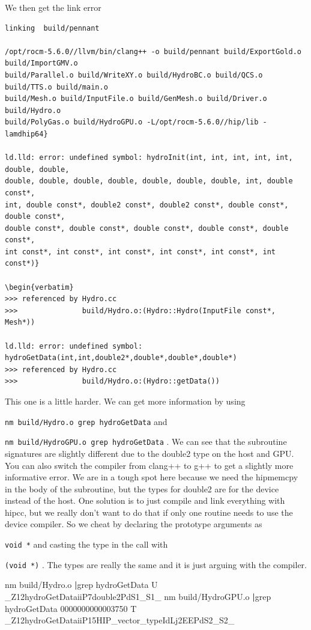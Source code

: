 \documentclass[
]{article}
\let\oldtexttt\texttt
\renewcommand{\texttt}[1]{
  \colorbox{Light}{\oldtexttt{#1}}
}
\newenvironment{Shaded}{}{}
\newcommand{\ExtensionTok}[1]{#1}
\newcommand{\FunctionTok}[1]{\textcolor[rgb]{0.02,0.16,0.49}{#1}}
\newcommand{\KeywordTok}[1]{\textcolor[rgb]{0.00,0.44,0.13}{\textbf{#1}}}
\newcommand{\NormalTok}[1]{#1}
\begin{document}
We then get the link error

\begin{verbatim}
linking  build/pennant

/opt/rocm-5.6.0//llvm/bin/clang++ -o build/pennant build/ExportGold.o build/ImportGMV.o 
build/Parallel.o build/WriteXY.o build/HydroBC.o build/QCS.o build/TTS.o build/main.o
build/Mesh.o build/InputFile.o build/GenMesh.o build/Driver.o build/Hydro.o 
build/PolyGas.o build/HydroGPU.o -L/opt/rocm-5.6.0//hip/lib -lamdhip64}

ld.lld: error: undefined symbol: hydroInit(int, int, int, int, int, double, double, 
double, double, double, double, double, double, double, int, double const*, 
int, double const*, double2 const*, double2 const*, double const*, double const*, 
double const*, double const*, double const*, double const*, double const*,
int const*, int const*, int const*, int const*, int const*, int const*)}

\begin{verbatim}
>>> referenced by Hydro.cc
>>>               build/Hydro.o:(Hydro::Hydro(InputFile const*, Mesh*))

ld.lld: error: undefined symbol: hydroGetData(int,int,double2*,double*,double*,double*)
>>> referenced by Hydro.cc
>>>               build/Hydro.o:(Hydro::getData())
\end{verbatim}

This one is a little harder. We can get more information by using
\texttt{nm\ build/Hydro.o\ \textbar{}grep\ hydroGetData} and
\texttt{nm\ build/HydroGPU.o\ \textbar{}grep\ hydroGetData}. We can see
that the subroutine signatures are slightly different due to the double2
type on the host and GPU. You can also switch the compiler from clang++
to g++ to get a slightly more informative error. We are in a tough spot
here because we need the hipmemcpy in the body of the subroutine, but
the types for double2 are for the device instead of the host. One
solution is to just compile and link everything with hipcc, but we
really don't want to do that if only one routine needs to use the device
compiler. So we cheat by declaring the prototype arguments as
\texttt{void\ *} and casting the type in the call with
\texttt{(void\ *)}. The types are really the same and it is just arguing
with the compiler.

\begin{Shaded}
\begin{Highlighting}[]
\FunctionTok{nm}\NormalTok{ build/Hydro.o }\KeywordTok{|}\FunctionTok{grep}\NormalTok{ hydroGetData}
                 \ExtensionTok{U}\NormalTok{ \_Z12hydroGetDataiiP7double2PdS1\_S1\_}
\FunctionTok{nm}\NormalTok{ build/HydroGPU.o }\KeywordTok{|}\FunctionTok{grep}\NormalTok{ hydroGetData}
\ExtensionTok{0000000000003750}\NormalTok{ T \_Z12hydroGetDataiiP15HIP\_vector\_typeIdLj2EEPdS2\_S2\_}
\end{Highlighting}
\end{Shaded}
\end{document}
